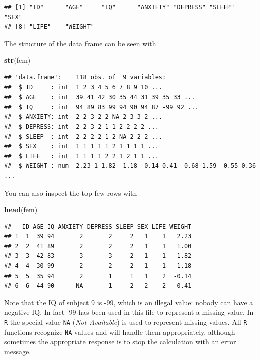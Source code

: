\documentclass[
]{book}
\newenvironment{Shaded}{\begin{snugshade}}{\end{snugshade}}
\newcommand{\FunctionTok}[1]{\textcolor[rgb]{0.13,0.29,0.53}{\textbf{#1}}}
\newcommand{\NormalTok}[1]{#1}
\begin{document}
\begin{verbatim}
## [1] "ID"      "AGE"     "IQ"      "ANXIETY" "DEPRESS" "SLEEP"   "SEX"    
## [8] "LIFE"    "WEIGHT"
\end{verbatim}

The structure of the data frame can be seen with

\begin{Shaded}
\begin{Highlighting}[]
\FunctionTok{str}\NormalTok{(fem)}
\end{Highlighting}
\end{Shaded}

\begin{verbatim}
## 'data.frame':    118 obs. of  9 variables:
##  $ ID     : int  1 2 3 4 5 6 7 8 9 10 ...
##  $ AGE    : int  39 41 42 30 35 44 31 39 35 33 ...
##  $ IQ     : int  94 89 83 99 94 90 94 87 -99 92 ...
##  $ ANXIETY: int  2 2 3 2 2 NA 2 3 3 2 ...
##  $ DEPRESS: int  2 2 3 2 1 1 2 2 2 2 ...
##  $ SLEEP  : int  2 2 2 2 1 2 NA 2 2 2 ...
##  $ SEX    : int  1 1 1 1 1 2 1 1 1 1 ...
##  $ LIFE   : int  1 1 1 1 2 2 1 2 1 1 ...
##  $ WEIGHT : num  2.23 1 1.82 -1.18 -0.14 0.41 -0.68 1.59 -0.55 0.36 ...
\end{verbatim}

You can also inspect the top few rows with

\begin{Shaded}
\begin{Highlighting}[]
\FunctionTok{head}\NormalTok{(fem)}
\end{Highlighting}
\end{Shaded}

\begin{verbatim}
##   ID AGE IQ ANXIETY DEPRESS SLEEP SEX LIFE WEIGHT
## 1  1  39 94       2       2     2   1    1   2.23
## 2  2  41 89       2       2     2   1    1   1.00
## 3  3  42 83       3       3     2   1    1   1.82
## 4  4  30 99       2       2     2   1    1  -1.18
## 5  5  35 94       2       1     1   1    2  -0.14
## 6  6  44 90      NA       1     2   2    2   0.41
\end{verbatim}

Note that the IQ of subject 9 is -99, which is an illegal value:
nobody can have a negative IQ. In fact -99 has been used in this file
to represent a missing value. In \texttt{R} the special value
\texttt{NA} (\emph{Not Available}) is used to represent missing values. All
\texttt{R} functions recognize \texttt{NA} values and will handle them
appropriately, although sometimes the appropriate response is to stop
the calculation with an error message.
\end{document}
